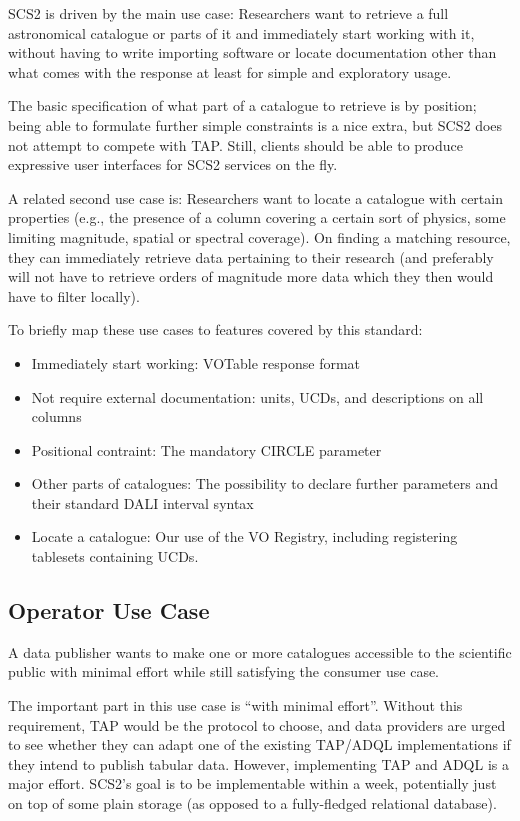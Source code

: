 \documentclass[11pt,a4paper]{ivoa}
\begin{document}
SCS2 is driven by the main use case: Researchers want to retrieve a
full astronomical catalogue or parts of it and immediately start working
with it, without having to write importing software or locate
documentation other than what comes with the response at least for
simple and exploratory usage.

The basic specification of what part of a
catalogue to retrieve is by position; being able to
formulate further simple constraints is a nice extra, but SCS2 does not
attempt to compete with TAP.  Still, clients should be able to produce
expressive user interfaces for SCS2 services on the fly.

A related second use case is: Researchers want to locate a catalogue
with certain properties (e.g., the presence of a column covering a
certain sort of physics, some limiting magnitude, spatial or spectral
coverage).  On finding a matching resource, they can immediately
retrieve
data pertaining to their research (and preferably will not have to
retrieve orders of magnitude more data which they then would have to
filter locally).

To briefly map these use cases to features covered by this standard:

\begin{itemize}
\item Immediately start working: VOTable response format
\item Not require external documentation: units, UCDs, and descriptions
on all columns
\item Positional contraint: The mandatory CIRCLE parameter
\item Other parts of catalogues: The possibility to declare further
parameters and their standard DALI interval syntax
\item Locate a catalogue: Our use of the VO Registry, including
registering tablesets containing UCDs.
\end{itemize}


\subsection{Operator Use Case}

A data publisher wants to make one or more catalogues accessible to the
scientific public with minimal effort while still satisfying the
consumer use case.

The important part in this use case is ``with minimal effort''.
Without this requirement, TAP would be the protocol to choose, and data
providers are urged to see whether they can adapt one of the existing
TAP/ADQL implementations if they intend to publish tabular data.
However, implementing TAP and ADQL is a major
effort.  SCS2's goal is to be implementable within a week, potentially
just on top of some plain storage (as opposed to a fully-fledged
relational database).
\end{document}
